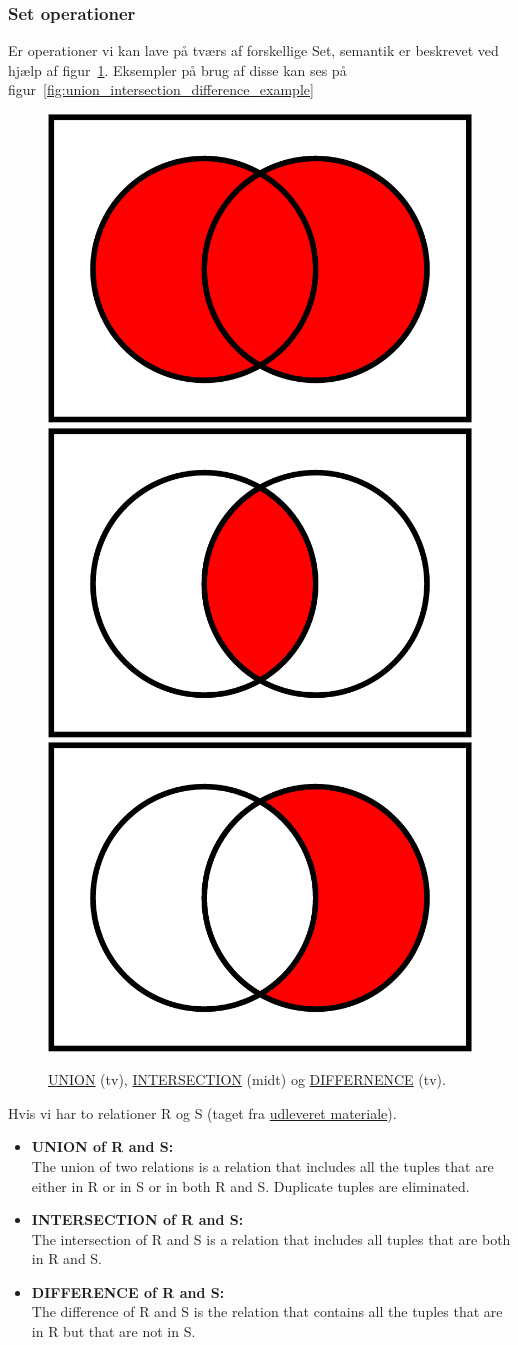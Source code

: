 \subsubsection{Set operationer}

Er operationer vi kan lave på tværs af forskellige Set, semantik er beskrevet ved hjælp af figur~\ref{fig:union_intersection_difference}. Eksempler på brug af disse kan ses på figur~\ref{fig:union_intersection_difference_example}

\begin{figure}[H]
	\centering
	\includegraphics[width=.3\textwidth]{figs/spm6/union}\hfill
	\includegraphics[width=.3\textwidth]{figs/spm6/intersection}\hfill
	\includegraphics[width=.3\textwidth]{figs/spm6/difference}
	
	\caption{\href{https://en.wikipedia.org/wiki/Union_(set_theory)}{UNION} (tv), \href{https://en.wikipedia.org/wiki/Intersection_(set_theory)}{INTERSECTION} (midt) og \href{https://en.wikipedia.org/wiki/Complement_(set_theory)}{DIFFERNENCE} (tv).}
	\label{fig:union_intersection_difference}	
\end{figure}

Hvis vi har to relationer R og S (taget fra \href{http://db.grussell.org/section010.html#_Toc67114476}{udleveret materiale}). 

\begin{itemize}
	
	\item \textbf{UNION of R and S:}\\
	The union of two relations is a relation that includes all the tuples that are either in R or in S or in both R and S. Duplicate tuples are eliminated.
	
	\item \textbf{INTERSECTION of R and S:}\\
	The intersection of R and S is a relation that includes all tuples that are both in R and S.
	
	\item \textbf{DIFFERENCE of R and S:}\\
	The difference of R and S is the relation that contains all the tuples that are in R but that are not in S.
\end{itemize}


